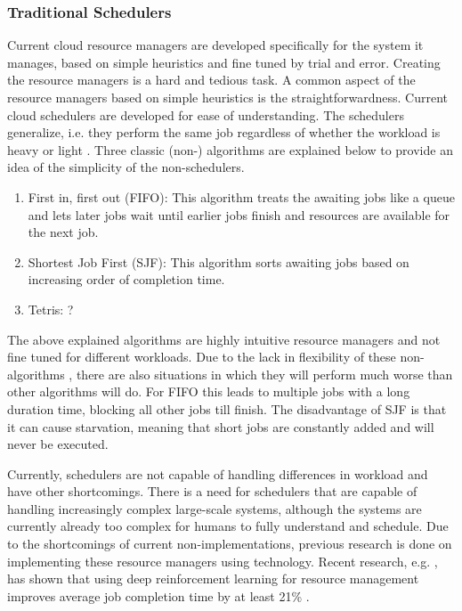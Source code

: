 \subsubsection{Traditional Schedulers}

Current cloud resource managers are developed specifically for the system it
manages, based on simple heuristics and fine tuned by trial and error.
Creating the resource managers is a hard and tedious task. A common aspect of
the resource managers based on simple heuristics is the straightforwardness.
Current cloud schedulers are developed for ease of understanding. The
schedulers generalize, i.e. they perform the same job regardless of whether
the workload is heavy or light \cite{mao2019}. Three classic (non-\ai)
algorithms are explained below to provide an idea of the simplicity of the
non-\ai schedulers.

\begin{enumerate}
\item First in, first out (FIFO): This algorithm treats the awaiting jobs like
    a queue and lets later jobs wait until earlier jobs finish and resources
    are available for the next job.
\item Shortest Job First (SJF): This algorithm sorts awaiting jobs based on
    increasing order of completion time.
\item Tetris: ?
\end{enumerate}

The above explained algorithms are highly intuitive resource managers and not
fine tuned for different workloads. Due to the lack in flexibility of these
non-\ai algorithms , there are also situations in which they will perform much
worse than other algorithms will do. For FIFO this leads to multiple jobs with
a long duration time, blocking all other jobs till finish. The disadvantage of
SJF is that it can cause starvation, meaning that short jobs are constantly
added and will never be executed.

Currently, schedulers are not capable of handling differences in workload and
have other shortcomings. There is a need for schedulers that are capable of
handling increasingly complex large-scale systems, although the systems are
currently already too complex for humans to fully understand and schedule. Due
to the shortcomings of current non-\ai implementations, previous research is
done on implementing these resource managers using \ai technology. Recent
research, e.g. , has shown that
using deep reinforcement learning for resource management improves average job
completion time by at least 21\% \cite{mao2019}.

